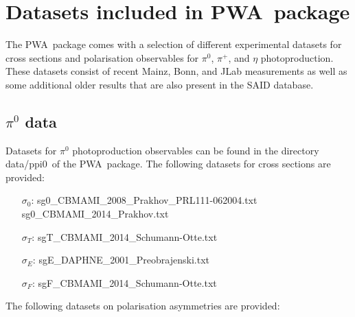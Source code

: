 \documentclass[a4paper,10pt]{article}
\def\PWA{\ttfamily PWA\rmfamily\ }
\def\tt{\ttfamily}
\def\rm{\rmfamily}
\begin{document}
\section{Datasets included in \PWA package}

The \PWA package comes with a selection of different experimental datasets for cross sections and polarisation observables
for $\pi^0$, $\pi^+$, and $\eta$ photoproduction. These datasets consist of recent Mainz, Bonn, and JLab measurements as well as
some additional older results that are also present in the SAID database.

\subsection{$\pi^0$ data}
Datasets for $\pi^0$ photoproduction observables can be found in the directory 
\tt data/ppi0\rm\ of the \PWA package. The following datasets for cross sections are provided:
\begin{itemize}
\item[$\sigma_0$:\:]
\tt sg0\_CBMAMI\_2008\_Prakhov\_PRL111-062004.txt\rm \\
\tt sg0\_CBMAMI\_2014\_Prakhov.txt\rm

\item[$\sigma_T$:\:]
\tt sgT\_CBMAMI\_2014\_Schumann-Otte.txt\rm

\item[$\sigma_E$:\:]
\tt sgE\_DAPHNE\_2001\_Preobrajenski.txt\rm

\item[$\sigma_F$:\:]
\tt sgF\_CBMAMI\_2014\_Schumann-Otte.txt\rm
\end{itemize}
The following datasets on polarisation asymmetries are provided:
\end{document}
